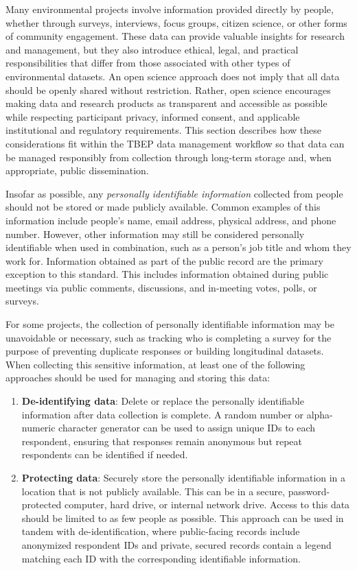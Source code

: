 \documentclass[
]{book}
\providecommand{\tightlist}{%
  \setlength{\itemsep}{0pt}\setlength{\parskip}{0pt}}
\begin{document}
Many environmental projects involve information provided directly by people, whether through surveys, interviews, focus groups, citizen science, or other forms of community engagement. These data can provide valuable insights for research and management, but they also introduce ethical, legal, and practical responsibilities that differ from those associated with other types of environmental datasets. An open science approach does not imply that all data should be openly shared without restriction. Rather, open science encourages making data and research products as transparent and accessible as possible while respecting participant privacy, informed consent, and applicable institutional and regulatory requirements. This section describes how these considerations fit within the TBEP data management workflow so that data can be managed responsibly from collection through long-term storage and, when appropriate, public dissemination.

Insofar as possible, any \emph{personally identifiable information} collected from people should not be stored or made publicly available. Common examples of this information include people's name, email address, physical address, and phone number. However, other information may still be considered personally identifiable when used in combination, such as a person's job title and whom they work for. Information obtained as part of the public record are the primary exception to this standard. This includes information obtained during public meetings via public comments, discussions, and in-meeting votes, polls, or surveys.

For some projects, the collection of personally identifiable information may be unavoidable or necessary, such as tracking who is completing a survey for the purpose of preventing duplicate responses or building longitudinal datasets. When collecting this sensitive information, at least one of the following approaches should be used for managing and storing this data:

\begin{enumerate}
\def\labelenumi{\arabic{enumi}.}
\tightlist
\item
  \textbf{De-identifying data}: Delete or replace the personally identifiable information after data collection is complete. A random number or alpha-numeric character generator can be used to assign unique IDs to each respondent, ensuring that responses remain anonymous but repeat respondents can be identified if needed.
\item
  \textbf{Protecting data}: Securely store the personally identifiable information in a location that is not publicly available. This can be in a secure, password-protected computer, hard drive, or internal network drive. Access to this data should be limited to as few people as possible. This approach can be used in tandem with de-identification, where public-facing records include anonymized respondent IDs and private, secured records contain a legend matching each ID with the corresponding identifiable information.
\end{enumerate}
\end{document}
